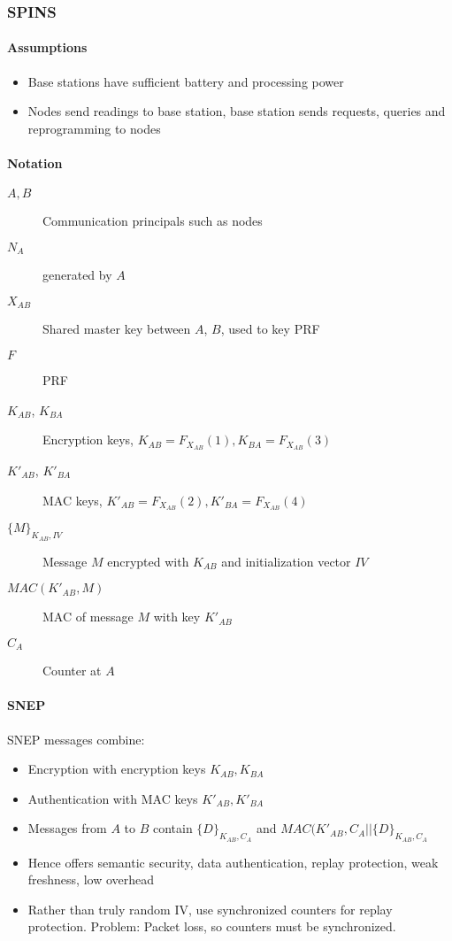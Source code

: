 \subsubsection{SPINS}

\paragraph{Assumptions}

\begin{itemize}
		\item Base stations have sufficient battery and processing power
		\item Nodes send readings to base station, base station sends requests, queries and reprogramming to nodes
\end{itemize}

\paragraph{Notation}

\begin{description}
		\item[$A, B$] Communication principals such as nodes
		\item[$N_A$] generated by $A$
		\item[$X_{AB}$] Shared master key between $A$, $B$, used to key PRF
		\item[$F$] PRF
		\item[$K_{AB}$, $K_{BA}$] Encryption keys, $K_{AB} = F_{X_{AB}}(1), K_{BA} = F_{X_{AB}}(3)$
		\item[$K'_{AB}$, $K'_{BA}$] MAC keys, $K'_{AB} = F_{X_{AB}}(2), K'_{BA} = F_{X_{AB}}(4)$
		\item[$\{M\}_{K_{AB}, IV}$] Message $M$ encrypted with $K_{AB}$ and initialization vector $IV$
		\item[$MAC(K'_{AB}, M)$] MAC of message $M$ with key $K'_{AB}$
		\item[$C_A$] Counter at $A$
\end{description}

\paragraph{SNEP}

SNEP messages combine:
\begin{itemize}
		\item Encryption with encryption keys $K_{AB}, K_{BA}$
		\item Authentication with MAC keys $K'_{AB}, K'_{BA}$
		\item Messages from $A$ to $B$ contain $\{D\}_{K_{AB}, C_A}$ and $MAC(K'_{AB}, C_A || \{D\}_{K_{AB}, C_A}$
		\item Hence offers semantic security, data authentication, replay protection, weak freshness, low overhead
		\item Rather than truly random IV, use synchronized counters for replay
				protection. Problem: Packet loss, so counters must be
				synchronized.
\end{itemize}

